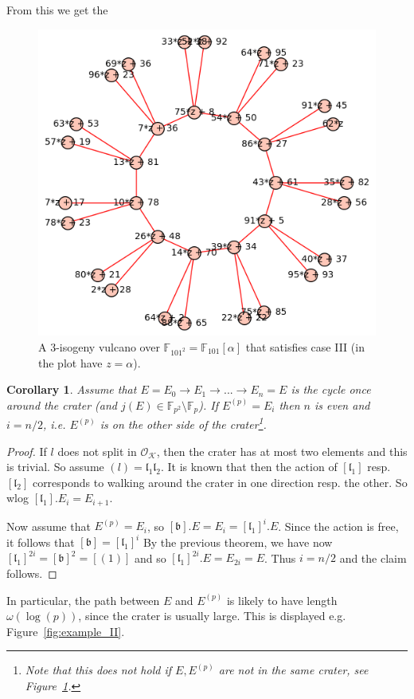 \documentclass{scrartcl}
\newcommand{\F}{\mathbb{F}}
\newcommand{\K}{\mathcal{K}}
\renewcommand{\l}{\mathfrak{l}}
\renewcommand{\b}{\mathfrak{b}}
\renewcommand{\O}{\mathcal{O}}
\newtheorem{corollary}[prop]{Corollary}
\theoremstyle{definition}
\begin{document}
From this we get the
\begin{figure}
    \includegraphics{./example_odd_crater.png}
    \caption{\label{fig:example_odd_crater} A 3-isogeny vulcano over $\F_{101^2} = \F_{101}[\alpha]$ that satisfies case III (in the plot have $z = \alpha$).}
\end{figure}
\begin{corollary}
    Assume that $E = E_0 \to E_1 \to ... \to E_n = E$ is the cycle once around the crater (and $j(E) \in \F_{p^2} \setminus \F_p$).
    If $E^{(p)} = E_i$ then $n$ is even and $i = n/2$, i.e. $E^{(p)}$ is on the other side of the crater\footnote{Note that this does not hold if $E, E^{(p)}$ are not in the same crater, see Figure~\ref{fig:example_odd_crater}.}.
\end{corollary}
\begin{proof}
    If $l$ does not split in $\O_\K$, then the crater has at most two elements and this is trivial.
    So assume $(l) = \l_1 \l_2$.
    It is known that then the action of $[\l_1]$ resp. $[\l_2]$ corresponds to walking around the crater in one direction resp. the other.
    So wlog $[\l_1].E_i = E_{i + 1}$.

    Now assume that $E^{(p)} = E_i$, so $[\b].E = E_i = [\l_1]^i.E$.
    Since the action is free, it follows that $[\b] = [\l_1]^i$
    By the previous theorem, we have now $[\l_1]^{2i} = [\b]^2 = [(1)]$ and so $[\l_1]^{2i}.E = E_{2i} = E$.
    Thus $i = n/2$ and the claim follows.
\end{proof}
In particular, the path between $E$ and $E^{(p)}$ is likely to have length $\omega(\log(p))$, since the crater is usually large.
This is displayed e.g. Figure~\ref{fig:example_II}.
\end{document}
